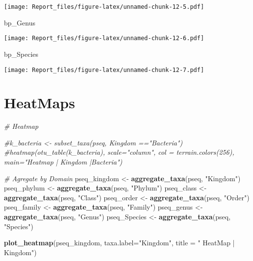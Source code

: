 \documentclass[]{article}
\newenvironment{Shaded}{\begin{snugshade}}{\end{snugshade}}
\newcommand{\CommentTok}[1]{\textcolor[rgb]{0.56,0.35,0.01}{\textit{#1}}}
\newcommand{\DataTypeTok}[1]{\textcolor[rgb]{0.13,0.29,0.53}{#1}}
\newcommand{\KeywordTok}[1]{\textcolor[rgb]{0.13,0.29,0.53}{\textbf{#1}}}
\newcommand{\NormalTok}[1]{#1}
\newcommand{\StringTok}[1]{\textcolor[rgb]{0.31,0.60,0.02}{#1}}
\begin{document}
\texttt{[image: Report\_files/figure-latex/unnamed-chunk-12-5.pdf]}

\begin{Shaded}
\begin{Highlighting}[]
\NormalTok{bp_Genus}
\end{Highlighting}
\end{Shaded}

\texttt{[image: Report\_files/figure-latex/unnamed-chunk-12-6.pdf]}

\begin{Shaded}
\begin{Highlighting}[]
\NormalTok{bp_Species}
\end{Highlighting}
\end{Shaded}

\texttt{[image: Report\_files/figure-latex/unnamed-chunk-12-7.pdf]}

\hypertarget{heatmaps}{%
\section{HeatMaps}\label{heatmaps}}

\begin{Shaded}
\begin{Highlighting}[]
\CommentTok{# Heatmap}

\CommentTok{#k_bacteria <- subset_taxa(pseq, Kingdom =="Bacteria")}
\CommentTok{#heatmap(otu_table(k_bacteria), scale="column", col = terrain.colors(256), main="Heatmap | Kingdom |Bacteria")}

\CommentTok{# Agregate by Domain}
\NormalTok{pseq_kingdom <-}\StringTok{ }\KeywordTok{aggregate_taxa}\NormalTok{(pseq, }\StringTok{"Kingdom"}\NormalTok{)}
\NormalTok{pseq_phylum <-}\StringTok{ }\KeywordTok{aggregate_taxa}\NormalTok{(pseq, }\StringTok{"Phylum"}\NormalTok{)}
\NormalTok{pseq_class <-}\StringTok{ }\KeywordTok{aggregate_taxa}\NormalTok{(pseq, }\StringTok{"Class"}\NormalTok{)}
\NormalTok{pseq_order <-}\StringTok{ }\KeywordTok{aggregate_taxa}\NormalTok{(pseq, }\StringTok{"Order"}\NormalTok{)}
\NormalTok{pseq_family <-}\StringTok{ }\KeywordTok{aggregate_taxa}\NormalTok{(pseq, }\StringTok{"Family"}\NormalTok{) }
\NormalTok{pseq_genus <-}\StringTok{ }\KeywordTok{aggregate_taxa}\NormalTok{(pseq, }\StringTok{"Genus"}\NormalTok{)}
\NormalTok{pseq_Species <-}\StringTok{ }\KeywordTok{aggregate_taxa}\NormalTok{(pseq, }\StringTok{"Species"}\NormalTok{)}

\KeywordTok{plot_heatmap}\NormalTok{(pseq_kingdom, }\DataTypeTok{taxa.label=}\StringTok{"Kingdom"}\NormalTok{, }\DataTypeTok{title =} \StringTok{" HeatMap | Kingdom"}\NormalTok{)}
\end{Highlighting}
\end{Shaded}
\end{document}
